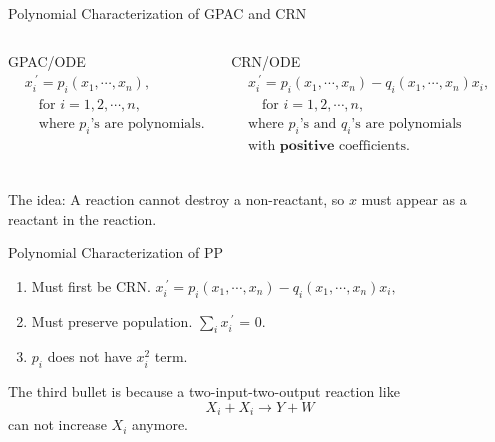 \documentclass[aspectratio=169]{beamer}
\begin{document}
\begin{frame}[Clean]{Polynomial Characterization of GPAC and CRN}
    \begin{columns}
         \vspace*{-0.6em}
        \begin{block}{GPAC/ODE}
            \vspace*{-1em}
            \begin{align*}
                &x_i^{\ \prime  }= p_i(x_1,\cdots,x_n), \\
                 &\quad\text{for $i=1,2,\cdots,n$},\\
                 &\quad\text{where $p_i$'s are polynomials.}
            \end{align*}
            \vspace*{-2.5em}
        \end{block}


        \vspace*{0.5em}
        \begin{block}{CRN/ODE\footnotemark}
            \vspace*{-1em}
            \begin{align*}
                &x_i^{\ \prime}=p_i(x_1,\cdots, x_n)-q_i(x_1,\cdots, x_n)x_i,\\
                &\quad\text{for $i=1,2,\cdots,n$},\\
                &\text{where $p_i$'s and $q_i$'s are polynomials} \\
                &\text{with }\mathbf{positive} \text{ coefficients.}\\
            \end{align*}
            \vspace*{-3.5em}

        \end{block}
   \end{columns}
\hspace{2em}
The idea: A reaction cannot destroy a non-reactant, so $x$ must
appear as a reactant in the reaction.
\end{frame}
\begin{frame}{Polynomial Characterization of PP}
\begin{enumerate}
    \item Must first be CRN. $x_i^{\ \prime}=p_i(x_1,\cdots, x_n)-q_i(x_1,\cdots, x_n)x_i,$
    \item Must preserve population. $\sum_{i} x_i^{\ \prime}$ = 0.
    \item $p_i$ does not have $x_i^2$ term.
\end{enumerate}
The third bullet is because a two-input-two-output reaction like
\[
    X_i + X_i \to  Y + W
\]
can not increase $X_i$ anymore.
\end{frame}
\end{document}

